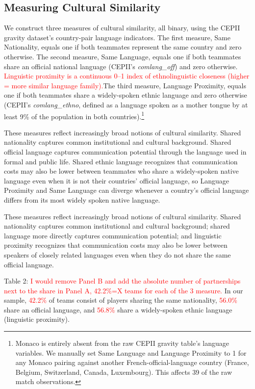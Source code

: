 \documentclass[10pt]{article}
\begin{document}
\subsection{Measuring Cultural Similarity}

We construct three measures of cultural similarity, all binary, using the CEPII gravity dataset's country-pair language indicators. The first measure, Same Nationality, equals one if both teammates represent the same country and zero otherwise. The second measure, Same Language, equals one if both teammates share an official national language (CEPII's \textit{comlang\_off}) and zero otherwise. \textcolor{red}{Linguistic proximity
is a continuous 0–1 index of ethnolinguistic closeness (higher = more similar language family).}The third measure, Language Proximity, equals one if both teammates share a widely-spoken ethnic language and zero otherwise (CEPII's \textit{comlang\_ethno}, defined as a language spoken as a mother tongue by at least 9\% of the population in both countries).\footnote{Monaco is entirely absent from the raw CEPII gravity table's language variables. We manually set Same Language and Language Proximity to 1 for any Monaco pairing against another French-official-language country (France, Belgium, Switzerland, Canada, Luxembourg). This affects 39 of the raw match observations.}

These measures reflect increasingly broad notions of cultural similarity. Shared nationality captures common institutional and cultural background. Shared official language captures communication potential through the language used in formal and public life. Shared ethnic language recognizes that communication costs may also be lower between teammates who share a widely-spoken native language even when it is not their countries' official language, so Language Proximity and Same Language can diverge whenever a country's official language differs from its most widely spoken native language.

These measures reflect increasingly broad notions of cultural similarity. Shared nationality captures common institutional and cultural background; shared language more directly captures communication potential; and linguistic proximity recognizes that communication costs may also be lower between speakers of closely related languages even when they do not share the same official language.

Table 2: \textcolor{red}{I would remove Panel B and add the absolute number of partnerships next to the share in Panel A, 42.2\%=X teams for each of the 3 measure.}  In our sample,  \textcolor{red}{42.2\%} of teams consist of players sharing the same nationality, \textcolor{red}{56.0\%} share an official language, and \textcolor{red}{56.8\%} share a widely-spoken ethnic language (linguistic proximity).
\end{document}
